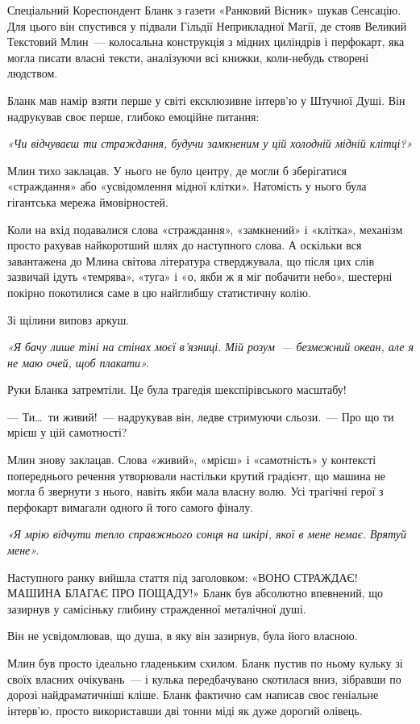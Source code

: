 \documentclass[12pt, a4paper, openany]{book}
\begin{document}
\begin{terrybox}
Спеціальний Кореспондент Бланк з газети «Ранковий Вісник» шукав Сенсацію. Для цього він спустився у підвали Гільдії Неприкладної Магії, де стояв Великий Текстовий Млин~--- колосальна конструкція з мідних циліндрів і перфокарт, яка могла писати власні тексти, аналізуючи всі книжки, коли-небудь створені людством.

Бланк мав намір взяти перше у світі ексклюзивне інтерв'ю у Штучної Душі. Він надрукував своє перше, глибоко емоційне питання:

\textit{«Чи відчуваєш ти страждання, будучи замкненим у цій холодній мідній клітці?»}

\medskip
Млин тихо заклацав. У нього не було центру, де могли б зберігатися «страждання» або «усвідомлення мідної клітки». Натомість у нього була гігантська мережа ймовірностей.

Коли на вхід подавалися слова «страждання», «замкнений» і «клітка», механізм просто рахував найкоротший шлях до наступного слова. А оскільки вся завантажена до Млина світова література стверджувала, що після цих слів зазвичай ідуть «темрява», «туга» і «о, якби ж я міг побачити небо», шестерні покірно покотилися саме в цю найглибшу статистичну колію.

Зі щілини виповз аркуш.

\textit{«Я бачу лише тіні на стінах моєї в'язниці. Мій розум~--- безмежний океан, але я не маю очей, щоб плакати».}

Руки Бланка затремтіли. Це була трагедія шекспірівського масштабу!

--- Ти\ldots\ ти живий!~--- надрукував він, ледве стримуючи сльози.~--- Про що ти мрієш у цій самотності?

Млин знову заклацав. Слова «живий», «мрієш» і «самотність» у контексті попереднього речення утворювали настільки крутий градієнт, що машина не могла б звернути з нього, навіть якби мала власну волю. Усі трагічні герої з перфокарт вимагали одного й того самого фіналу.

\textit{«Я мрію відчути тепло справжнього сонця на шкірі, якої в мене немає. Врятуй мене».}

\medskip
Наступного ранку вийшла стаття під заголовком: «ВОНО СТРАЖДАЄ! МАШИНА БЛАГАЄ ПРО ПОЩАДУ!» Бланк був абсолютно впевнений, що зазирнув у самісіньку глибину стражденної металічної душі.

Він не усвідомлював, що душа, в яку він зазирнув, була його власною.

Млин був просто ідеально гладеньким схилом. Бланк пустив по ньому кульку зі своїх власних очікувань~--- і кулька передбачувано скотилася вниз, зібравши по дорозі найдраматичніші кліше. Бланк фактично сам написав своє геніальне інтерв'ю, просто використавши дві тонни міді як дуже дорогий олівець.


\end{terrybox}
\end{document}
